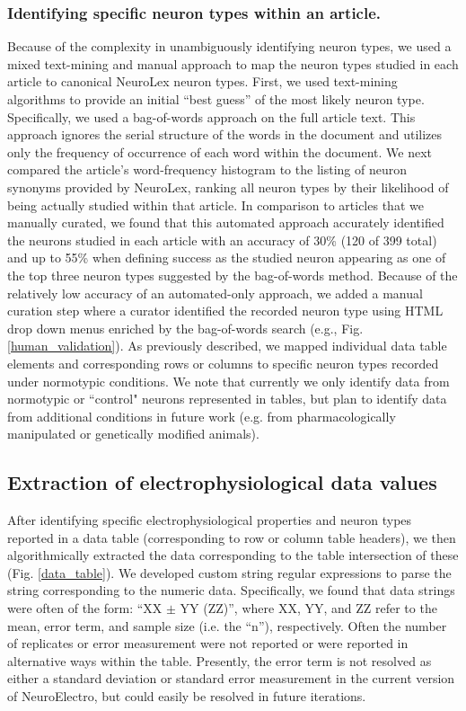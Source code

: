 \documentclass{template/frontiersSCNS} %
\begin{document}
\subsubsection{Identifying specific neuron types within an article.}
Because of the complexity in unambiguously identifying neuron types, we used a mixed text-mining and manual approach to map the neuron types studied in each article to canonical NeuroLex neuron types.  
First, we used text-mining algorithms to provide an initial ``best guess'' of the most likely neuron type.  
Specifically, we used a bag-of-words approach \citep{aldous_exchangeability_1985} on the full article text.  
This approach ignores the serial structure of the words in the document and utilizes only the frequency of occurrence of each word within the document. 
We next compared the article's word-frequency histogram to the listing of neuron synonyms provided by NeuroLex, ranking all neuron types by their likelihood of being actually studied within that article.  
In comparison to articles that we manually curated, we found that this automated approach accurately identified the neurons studied in each article with an accuracy of 30\% (120 of 399 total) and up to 55\% when defining success as the studied neuron appearing as one of the top three neuron types suggested by the bag-of-words method.  
Because of the relatively low accuracy of an automated-only approach, we added a manual curation step where a curator identified the recorded neuron type using HTML drop down menus enriched by the bag-of-words search (e.g., Fig. \ref{human_validation}).  
As previously described, we mapped individual data table elements and corresponding rows or columns to specific neuron types recorded under normotypic conditions.  
We note that currently we only identify data from normotypic or ``control" neurons represented in tables, but plan to identify data from additional conditions in future work (e.g. from pharmacologically manipulated or genetically modified animals).

\subsection{Extraction of electrophysiological data values}
After identifying specific electrophysiological properties and neuron types reported in a data table (corresponding to row or column table headers), we then algorithmically extracted the data corresponding to the table intersection of these (Fig. \ref{data_table}).  
We developed custom string regular expressions \citep{thompson_programming_1968} to parse the string corresponding to the numeric data.  
Specifically, we found that data strings were often of the form: ``XX $\pm$ YY (ZZ)'', where XX, YY, and ZZ refer to the mean, error term, and sample size (i.e. the ``n''), respectively.  
Often the number of replicates or error measurement were not reported or were reported in alternative ways within the table.  
Presently, the error term is not resolved as either a standard deviation or standard error measurement in the current version of NeuroElectro, but could easily be resolved in future iterations.
\end{document}
